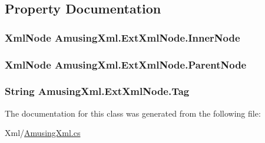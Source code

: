 \subsection{Property Documentation}
\hypertarget{class_amusing_xml_1_1_ext_xml_node_a4b14463a39170691895230af0c610985}{
\subsubsection[{InnerNode}]{\setlength{\rightskip}{0pt plus 5cm}XmlNode AmusingXml.ExtXmlNode.InnerNode}}
\label{class_amusing_xml_1_1_ext_xml_node_a4b14463a39170691895230af0c610985}
\hypertarget{class_amusing_xml_1_1_ext_xml_node_a28fb4031a1802944860c53faa218645d}{
\subsubsection[{ParentNode}]{\setlength{\rightskip}{0pt plus 5cm}XmlNode AmusingXml.ExtXmlNode.ParentNode}}
\label{class_amusing_xml_1_1_ext_xml_node_a28fb4031a1802944860c53faa218645d}
\hypertarget{class_amusing_xml_1_1_ext_xml_node_a9baf3d709ff4f089cd4813cd99c37b77}{
\subsubsection[{Tag}]{\setlength{\rightskip}{0pt plus 5cm}String AmusingXml.ExtXmlNode.Tag}}
\label{class_amusing_xml_1_1_ext_xml_node_a9baf3d709ff4f089cd4813cd99c37b77}


The documentation for this class was generated from the following file:\begin{DoxyCompactItemize}
\item 
Xml/\hyperlink{_amusing_xml_8cs}{AmusingXml.cs}\end{DoxyCompactItemize}
